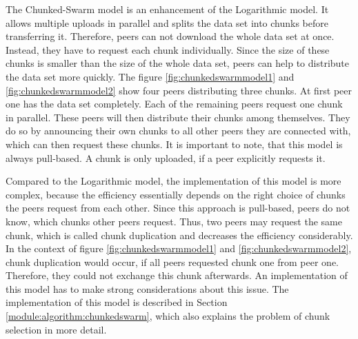 The Chunked-Swarm model is an enhancement of the Logarithmic model. It allows multiple uploads in parallel and splits the data set into chunks before transferring it. Therefore, peers can not download the whole data set at once. Instead, they have to request each chunk individually. Since the size of these chunks is smaller than the size of the whole data set, peers can help to distribute the data set more quickly. The figure \ref{fig:chunkedswarmmodel1} and \ref{fig:chunkedswarmmodel2} show four peers distributing three chunks. At first peer one has the data set completely. Each of the remaining peers request one chunk in parallel. These peers will then distribute their chunks among themselves. They do so by announcing their own chunks to all other peers they are connected with, which can then request these chunks. It is important to note, that this model is always pull-based. A chunk is only uploaded, if a peer explicitly requests it.

Compared to the Logarithmic model, the implementation of this model is more complex, because the efficiency essentially depends on the right choice of chunks the peers request from each other. Since this approach is pull-based, peers do not know, which chunks other peers request. Thus, two peers may request the same chunk, which is called chunk duplication and decreases the efficiency considerably. In the context of figure \ref{fig:chunkedswarmmodel1} and \ref{fig:chunkedswarmmodel2}, chunk duplication would occur, if all peers requested chunk one from peer one. Therefore, they could not exchange this chunk afterwards. An implementation of this model has to make strong considerations about this issue. The implementation of this model is described in Section \ref{module:algorithm:chunkedswarm}, which also explains the problem of chunk selection in more detail. 

